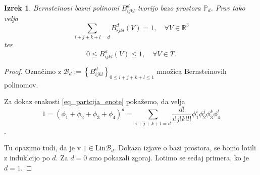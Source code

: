 \documentclass[11pt,a4paper]{article}
\newtheorem{theorem}{Izrek}
\begin{document}
\begin{theorem}\label{izrek_bernstein}
    Bernsteinovi bazni polinomi $B_{ijkl}^d$ tvorijo bazo prostora $\mathbb{P}_d$.
    Prav tako velja 
    \begin{equation}\label{eq_partcija_enote}
        \sum_{i+j+k+l = d} B_{ijkl}^d(V) = 1, \quad \forall V \in \mathbb{R}^3     
    \end{equation}
    ter
    \begin{equation}
        0 \leq B_{ijkl}^d(V) \leq 1, \quad \forall V \in T.
    \end{equation}
\end{theorem}

\begin{proof}
    Označimo z $\mathcal{B}_d := \left\{ B_{ijkl}^d  \right\}_{0\leq i+j+k+l \leq 1}$ množica
    Bernsteinovih polinomov. 

    Za dokaz enakosti \eqref{eq_partcija_enote} pokažemo, da velja $$1 = \left( \phi_1 + \phi_2 + 
    \phi_3 + \phi_4  \right)^d = \sum_{i+j+k+l = d} \frac{d!}{i!j!k!l!} 
    \phi_1^i \phi_2^j \phi_3^k \phi_4^l$$.

    Tu opazimo tudi, da je v $1 \in \text{Lin} \mathcal{B}_d$. Dokaza izjave
    o bazi prostora, se bomo lotili z induklcijo po $d$. Za $d = 0$ smo pokazali zgoraj. Lotimo
    se sedaj primera, ko je $d = 1$.


\end{proof}
\end{document}
